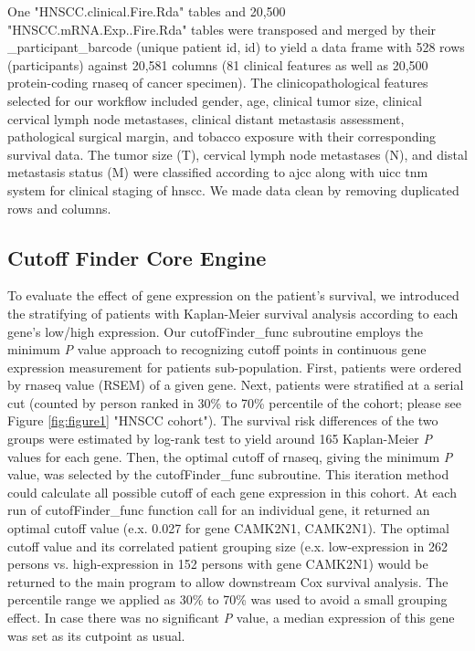 \documentclass[jpm,article,submit,moreauthors,pdftex]{Definitions/mdpi}
\begin{document}
\begin{paracol}{2}
One "HNSCC.clinical.Fire.Rda" tables and 20,500 "HNSCC.mRNA.Exp.\newline
[GeneName].Fire.Rda" tables were transposed and merged by their \newline
\_participant\_barcode (unique patient \acrlong{id}, \acrshort{id}) to yield a data frame with 528 rows (participants) against 20,581 columns (81 clinical features as well as 20,500 protein-coding \acrshort{rnaseq} of cancer specimen).
The clinicopathological features selected for our workflow included gender, age, clinical tumor size, clinical cervical lymph node metastases, clinical distant metastasis assessment, pathological surgical margin, and tobacco exposure with their corresponding survival data.
The tumor size (T), cervical lymph node metastases (N), and distal metastasis status (M) were classified according to \acrfull{ajcc}\cite{Amin2017} along with \acrfull{uicc}\cite{Brierley2016} \acrshort{tnm} system for clinical staging of \acrshort{hnscc}.
We made data clean by removing duplicated rows and columns.


\subsection{Cutoff Finder Core Engine}

To evaluate the effect of gene expression on the patient's survival, we introduced the stratifying of patients with Kaplan-Meier survival analysis according to each gene's low/high expression.
Our cutofFinder\_func subroutine employs the minimum \textit{P} value approach to recognizing cutoff points in continuous gene expression measurement for patients sub-population.
First, patients were ordered by \acrshort{rnaseq} value (RSEM) of a given gene. Next, patients were stratified at a serial cut (counted by person ranked in 30\% to 70\% percentile of the cohort; please see Figure \ref{fig:figure1} "HNSCC cohort"). The survival risk differences of the two groups were estimated by log-rank test to yield around 165 Kaplan-Meier \textit{P} values for each gene.
Then, the optimal cutoff of \acrshort{rnaseq}, giving the minimum \textit{P} value, was selected by the cutofFinder\_func subroutine.
This iteration method could calculate all possible cutoff of each gene expression in this cohort. At each run of cutofFinder\_func function call for an individual gene, it returned an optimal cutoff value (e.x. 0.027 for gene \acrlong{CAMK2N1}, \acrshort{CAMK2N1}). The optimal cutoff value and its correlated patient grouping size (e.x. low-expression in 262 persons vs. high-expression in 152 persons with gene \acrshort{CAMK2N1}) would be returned to the main program to allow downstream Cox survival analysis. The percentile range we applied as 30\% to 70\% was used to avoid a small grouping effect\cite{Miller1982}\cite{Mizuno2009a}.
In case there was no significant \textit{P} value, a median expression of this gene was set as its cutpoint as usual.


\end{paracol}
\end{document}
